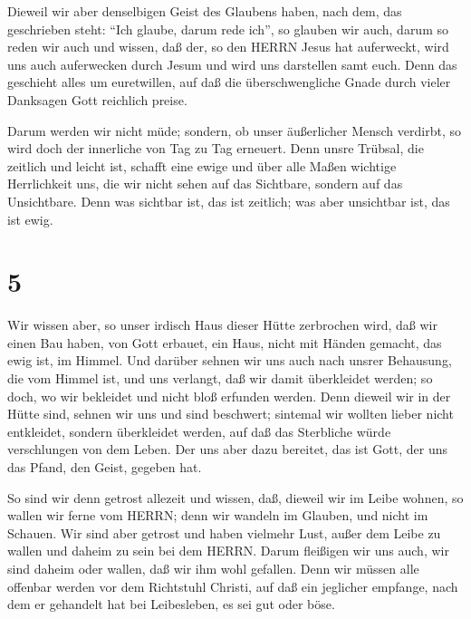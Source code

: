  Dieweil wir aber denselbigen Geist des Glaubens haben,
nach dem, das geschrieben steht: ``Ich glaube, darum rede ich'', so
glauben wir auch, darum so reden wir auch  und wissen, daß
der, so den HERRN Jesus hat auferweckt, wird uns auch auferwecken durch
Jesum und wird uns darstellen samt euch.  Denn das
geschieht alles um euretwillen, auf daß die überschwengliche Gnade durch
vieler Danksagen Gott reichlich preise.

 Darum werden wir nicht müde; sondern, ob unser äußerlicher
Mensch verdirbt, so wird doch der innerliche von Tag zu Tag erneuert.
 Denn unsre Trübsal, die zeitlich und leicht ist, schafft
eine ewige und über alle Maßen wichtige Herrlichkeit  uns,
die wir nicht sehen auf das Sichtbare, sondern auf das Unsichtbare. Denn
was sichtbar ist, das ist zeitlich; was aber unsichtbar ist, das ist
ewig.

\hypertarget{section-4}{%
\section{5}\label{section-4}}

 Wir wissen aber, so unser irdisch Haus dieser Hütte
zerbrochen wird, daß wir einen Bau haben, von Gott erbauet, ein Haus,
nicht mit Händen gemacht, das ewig ist, im Himmel.  Und
darüber sehnen wir uns auch nach unsrer Behausung, die vom Himmel ist,
und uns verlangt, daß wir damit überkleidet werden;  so
doch, wo wir bekleidet und nicht bloß erfunden werden.  Denn
dieweil wir in der Hütte sind, sehnen wir uns und sind beschwert;
sintemal wir wollten lieber nicht entkleidet, sondern überkleidet
werden, auf daß das Sterbliche würde verschlungen von dem Leben.
 Der uns aber dazu bereitet, das ist Gott, der uns das
Pfand, den Geist, gegeben hat.

 So sind wir denn getrost allezeit und wissen, daß, dieweil
wir im Leibe wohnen, so wallen wir ferne vom HERRN;  denn
wir wandeln im Glauben, und nicht im Schauen.  Wir sind aber
getrost und haben vielmehr Lust, außer dem Leibe zu wallen und daheim zu
sein bei dem HERRN.  Darum fleißigen wir uns auch, wir sind
daheim oder wallen, daß wir ihm wohl gefallen.  Denn wir
müssen alle offenbar werden vor dem Richtstuhl Christi, auf daß ein
jeglicher empfange, nach dem er gehandelt hat bei Leibesleben, es sei
gut oder böse.

